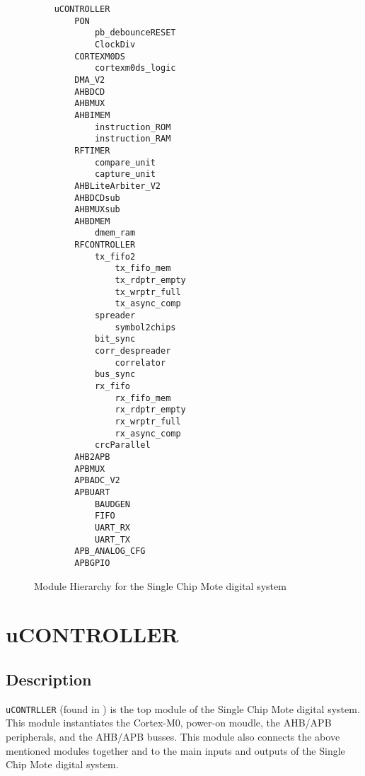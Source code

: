 \begin{figure}
	\small
	\begin{verbatim}
	uCONTROLLER
	    PON
	        pb_debounceRESET
	        ClockDiv
	    CORTEXM0DS
	        cortexm0ds_logic
	    DMA_V2
	    AHBDCD
	    AHBMUX
	    AHBIMEM
	        instruction_ROM
	        instruction_RAM
	    RFTIMER
	        compare_unit
	        capture_unit
	    AHBLiteArbiter_V2
	    AHBDCDsub
	    AHBMUXsub
	    AHBDMEM
	        dmem_ram
	    RFCONTROLLER
	        tx_fifo2
	            tx_fifo_mem
	            tx_rdptr_empty
	            tx_wrptr_full
	            tx_async_comp
	        spreader
	            symbol2chips
	        bit_sync
	        corr_despreader
	            correlator
	        bus_sync
	        rx_fifo
	            rx_fifo_mem
	            rx_rdptr_empty
	            rx_wrptr_full
	            rx_async_comp
	        crcParallel
	    AHB2APB
	    APBMUX
	    APBADC_V2
	    APBUART
	        BAUDGEN
	        FIFO
	        UART_RX
	        UART_TX
	    APB_ANALOG_CFG
	    APBGPIO
	\end{verbatim}
	\caption{Module Hierarchy for the Single Chip Mote digital system}
	\label{verb:module-hierarchy}
\end{figure}

\section{uCONTROLLER}

\subsection{Description}
\texttt{uCONTRLLER} (found in ) is the top module of the Single Chip Mote digital system. This module instantiates the Cortex-M0, power-on moudle, the AHB/APB peripherals, and the AHB/APB busses. This module also connects the above mentioned modules together and to the main inputs and outputs of the Single Chip Mote digital system.

